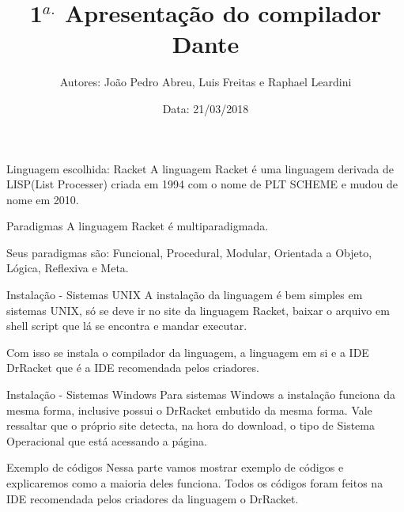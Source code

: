 \documentclass{beamer}
\title[Compiladores 2018.1]{1$^{a.}$ Apresentação do compilador Dante}
\author[Abrev.]{Autores: João Pedro Abreu, Luis Freitas e Raphael Leardini}
\institute[UFF]{Universidade Federal Fluminense}
\date{Data: 21/03/2018}
\begin{document}

\begin{frame}[plain]

\titlepage

\end{frame}


\begin{frame}{Linguagem escolhida: Racket}
A linguagem Racket é uma linguagem derivada de LISP(List Processer) criada em 1994 com o nome de PLT SCHEME e mudou de nome em 2010.
\end{frame}


\begin{frame}{Paradigmas}
A linguagem Racket é multiparadigmada.

Seus paradigmas são: Funcional, Procedural, Modular, Orientada a Objeto, Lógica, Reflexiva e Meta.

\end{frame}


\begin{frame}{Instalação - Sistemas UNIX}
A instalação da linguagem é bem simples em sistemas UNIX, só se deve ir no site da linguagem Racket, baixar o arquivo em shell script que lá se encontra e mandar executar.

Com isso se instala o compilador da linguagem, a linguagem em si e a IDE DrRacket que é a IDE recomendada pelos criadores.



\end{frame}


\begin{frame}{Instalação - Sistemas Windows}
Para sistemas Windows a instalação funciona da mesma forma, inclusive possui o DrRacket embutido da mesma forma. Vale ressaltar que o próprio site detecta, na hora do download, o tipo de Sistema Operacional que está acessando a página.

\end{frame}


\begin{frame}{Exemplo de códigos}
Nessa parte vamos mostrar exemplo de códigos e explicaremos como a maioria deles funciona.
Todos os códigos foram feitos na IDE recomendada pelos criadores da linguagem o DrRacket.
\end{frame}
\end{document}
